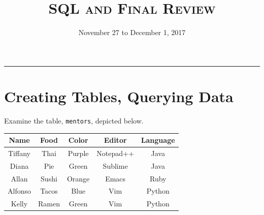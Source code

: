 \documentclass{exam}
\title{\textsc{SQL and Final Review}}
\date{November 27 to December 1, 2017}
\begin{document}
\maketitle
\rule{\textwidth}{0.15em}
\fontsize{12}{15}\selectfont

\section{Creating Tables, Querying Data}
Examine the table, \texttt{mentors}, depicted below.
\begin{center}
\begin{tabular}{ |c|c|c|c|c| }
 \hline
 \textbf{Name} & \textbf{Food} & \textbf{Color} & \textbf{Editor} & \textbf{Language} \\
 \hline
 Tiffany & Thai & Purple & Notepad++ & Java \\
 \hline
 Diana & Pie & Green & Sublime & Java \\
 \hline
  Allan & Sushi & Orange & Emacs & Ruby \\
 \hline
 Alfonso & Tacos & Blue & Vim & Python \\
 \hline
 Kelly & Ramen & Green & Vim & Python \\
 \hline
\end{tabular}
\end{center}
\end{document}
